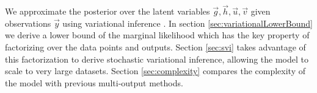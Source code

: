 %
%
We approximate the posterior over the latent variables $\vec{g}, \vec{h}, \vec{u}, \vec{v}$ given observations $\vec{y}$ using variational inference \citep{jordan-variational-99}.
In section \ref{sec:variationalLowerBound} we derive a lower bound of the marginal likelihood which has the key property of factorizing over the data points and outputs. Section \ref{sec:svi}  takes advantage of this factorization to 
derive stochastic variational inference, allowing the model to scale to very large datasets.
Section \ref{sec:complexity} compares the complexity of the model with previous multi-output methods.

